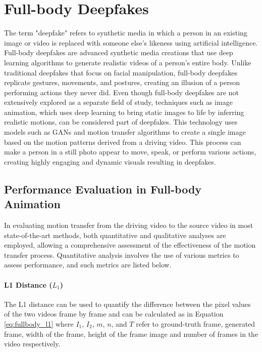 \section{Full-body Deepfakes}
\label{sec:fullbody_deepfakes}

The term "deepfake" refers to synthetic media in which a person in an existing image or video is replaced with someone else's likeness using artificial intelligence. Full-body deepfakes are advanced synthetic media creations that use deep learning algorithms to generate realistic videos of a person's entire body. Unlike traditional deepfakes that focus on facial manipulation, full-body deepfakes replicate gestures, movements, and postures, creating an illusion of a person performing actions they never did. Even though full-body deepfakes are not extensively explored as a separate field of study, techniques such as image animation, which uses deep learning to bring static images to life by inferring realistic motions, can be considered part of deepfakes. This technology uses models such as GANs and motion transfer algorithms to create a single image based on the motion patterns derived from a driving video. This process can make a person in a still photo appear to move, speak, or perform various actions, creating highly engaging and dynamic visuals resulting in deepfakes. 

\subsection{Performance Evaluation in Full-body Animation}
\label{sub:fullbody_metrics}

In evaluating motion transfer from the driving video to the source video in most state-of-the-art methods, both quantitative and qualitative analyses are employed, allowing a comprehensive assessment of the effectiveness of the motion transfer process. Quantitative analysis involves the use of various metrics to assess performance, and such metrics are listed below.  

\paragraph{L1 Distance ($L_1$)}

The L1 distance can be used to quantify the difference between the pixel values of the two videos frame by frame and can be calculated as in Equation \ref{eq:fullbody_l1} where $I_1$, $I_2$, $m$, $n$, and $T$ refer to ground-truth frame, generated frame, width of the frame, height of the frame image and number of frames in the video respectively.

